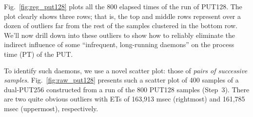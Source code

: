 \documentclass[letter]{ieice}
\begin{document}
Fig.~\ref{fig:reg_put128} plots all the 800 elapsed times of the run of PUT128.
The plot clearly shows three rows; that is, 
the top and middle rows represent over a dozen of outliers far from 
the rest of the samples clustered in the bottom row. 
We'll now drill down into these outliers to 
show how to reliably eliminate the indirect influence of 
some ``infrequent, long-running daemons'' on the process time (PT) 
of the PUT.

To identify such daemons, we use a novel scatter plot: 
those of {\em pairs of successive samples}. 
Fig.~\ref{fig:raw_put128} presents such a scatter plot 
of 400 samples of a \hbox{dual-PUT256} constructed 
from a run of the 800 PUT128 samples (Step~3). 
There are two quite obvious outliers with ETs of 163,913 msec (rightmost) and 161,785 msec (uppermost), respectively. 
\end{document}
